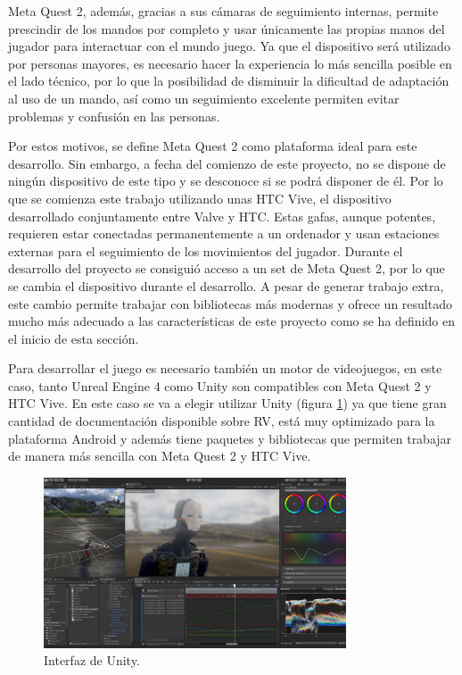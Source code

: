  Meta Quest 2, además, gracias a sus cámaras de seguimiento internas, permite prescindir de los mandos por completo y usar únicamente las propias manos del jugador para interactuar con el mundo juego. Ya que el dispositivo será utilizado por personas mayores, es necesario hacer la experiencia lo más sencilla posible en el lado técnico, por lo que la posibilidad de disminuir la dificultad de adaptación al uso de un mando, así como un seguimiento excelente permiten evitar problemas y confusión en las personas.

Por estos motivos, se define Meta Quest 2 como plataforma ideal para este desarrollo. Sin embargo, a fecha del comienzo de este proyecto, no se dispone de ningún dispositivo de este tipo y se desconoce si se podrá disponer de él. Por lo que se comienza este trabajo utilizando unas HTC Vive, el dispositivo desarrollado conjuntamente entre Valve y HTC. Estas gafas, aunque potentes, requieren estar conectadas permanentemente a un ordenador y usan estaciones externas para el seguimiento de los movimientos del jugador. Durante el desarrollo del proyecto se consiguió acceso a un set de Meta Quest 2, por lo que se cambia el dispositivo durante el desarrollo. A pesar de generar trabajo extra, este cambio permite trabajar con bibliotecas más modernas y ofrece un resultado mucho más adecuado a las características de este proyecto como se ha definido en el inicio de esta sección.


Para desarrollar el juego es necesario también un motor de videojuegos, en este caso, tanto Unreal Engine 4 como Unity son compatibles con Meta Quest 2 y HTC Vive. En este caso se va a elegir utilizar Unity (figura \ref{fig:TU_interfazUnity}) ya que tiene gran cantidad de documentación disponible sobre RV, está muy optimizado para la plataforma Android y además tiene paquetes y bibliotecas que permiten trabajar de manera más sencilla con Meta Quest 2 y HTC Vive.

\begin{figure}
  \centering
\includegraphics[width=0.8\textwidth]{03.EstudioProblema/03.TecnologiaAUsar/00.Figuras/02.interfaz_unity.jpg}
    \caption{Interfaz de Unity. \cite{EA_img_interfazUnity}}
    \label{fig:TU_interfazUnity}
\end{figure}

